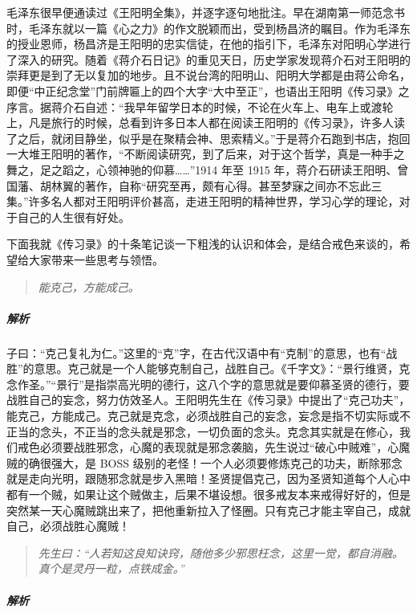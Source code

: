 毛泽东很早便通读过《王阳明全集》，并逐字逐句地批注。早在湖南第一师范念书时，毛泽东就以一篇《心之力》的作文脱颖而出，受到杨昌济的瞩目。作为毛泽东的授业恩师，杨昌济是王阳明的忠实信徒，在他的指引下，毛泽东对阳明心学进行了深入的研究。随着《蒋介石日记》的重见天日，历史学家发现蒋介石对王阳明的崇拜更是到了无以复加的地步。且不说台湾的阳明山、阳明大学都是由蒋公命名，即便“中正纪念堂”门前牌匾上的四个大字“大中至正”，也语出王阳明《传习录》之序言。据蒋介石自述：“我早年留学日本的时候，不论在火车上、电车上或渡轮上，凡是旅行的时候，总看到许多日本人都在阅读王阳明的《传习录》，许多人读了之后，就闭目静坐，似乎是在聚精会神、思索精义。”于是蒋介石跑到书店，抱回一大堆王阳明的著作，“不断阅读研究，到了后来，对于这个哲学，真是一种手之舞之，足之蹈之，心领神驰的仰慕……”1914 年至 1915 年，蒋介石研读王阳明、曾国藩、胡林翼的著作，自称“研究至再，颇有心得。甚至梦寐之间亦不忘此三集。”许多名人都对王阳明评价甚高，走进王阳明的精神世界，学习心学的理论，对于自己的人生很有好处。

下面我就《传习录》的十条笔记谈一下粗浅的认识和体会，是结合戒色来谈的，希望给大家带来一些思考与领悟。

\begin{quote}\it
    能克己，方能成己。
\end{quote}

\subparagraph{解析}

子曰：“克己复礼为仁。”这里的“克”字，在古代汉语中有“克制”的意思，也有“战胜”的意思。克己就是一个人能够克制自己，战胜自己。《千字文》：“景行维贤，克念作圣。”“景行”是指崇高光明的德行，这八个字的意思就是要仰慕圣贤的德行，要战胜自己的妄念，努力仿效圣人。王阳明先生在《传习录》中提出了“克己功夫”，能克己，方能成己。克己就是克念，必须战胜自己的妄念，妄念是指不切实际或不正当的念头，不正当的念头就是邪念，一切负面的念头。克念其实就是在修心，我们戒色必须要战胜邪念，心魔的表现就是邪念袭脑，先生说过“破心中贼难”，心魔贼的确很强大，是 BOSS 级别的老怪！一个人必须要修炼克己的功夫，断除邪念就是走向光明，跟随邪念就是步入黑暗！圣贤提倡克己，因为圣贤知道每个人心中都有一个贼，如果让这个贼做主，后果不堪设想。很多戒友本来戒得好好的，但是突然某一天心魔贼跳出来了，把他重新拉入了怪圈。只有克己才能主宰自己，成就自己，必须战胜心魔贼！

\begin{quote}\it
    先生曰：“人若知这良知诀窍，随他多少邪思枉念，这里一觉，都自消融。真个是灵丹一粒，点铁成金。”
\end{quote}

\subparagraph{解析}

